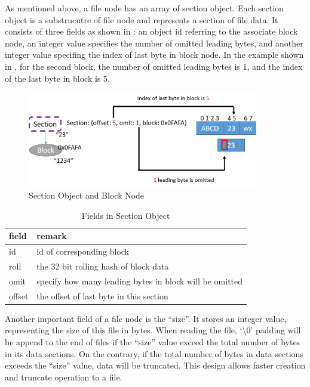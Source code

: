     As mentioned above, a file node has an array of section object. Each section object is a substrucutre of file node and represents a section of file data. It consists of three fields as shown in : an object id referring to the associate block node, an integer value specifies the number of omitted leading bytes, and another integer value specifing the index of last byte in block node. In the example shown in , for the second block, the number of omitted leading bytes is 1, and the index of the last byte in block is 5.

\begin{figure}[hbtp]
\centering
\includegraphics[width=0.9\textwidth]{Chapter-3/figs/fig9.png}
\caption{Section Object and Block Node}
\label{fig:section_and_block}
\end{figure}

\begin{table}
\caption{Fields in Section Object}
\label{tab:section_fields}
\begin{center}
\begin{tabular}{ll}
\toprule
field & remark\\
\midrule
id & id of corresponding block\\
roll & the 32 bit rolling hash of block data\\
omit & specify how many leading bytes in block will be omitted\\
offset & the offset of last byte in this section\\
\bottomrule
\end{tabular}
\end{center}
\end{table}

    Another important field of a file node is the ``size''. It stores an integer value, representing the size of this file in bytes. When reading the file, `\textbackslash0' padding will be append to the end of files if the ``size'' value exceed the total number of bytes in its data sections. On the contrary, if the total number of bytes in data sections exceeds the ``size'' value, data will be truncated. This design allows faster creation and truncate operation to a file.

